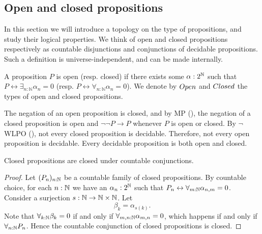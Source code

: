 %
\subsection{Open and closed propositions}
In this section we will introduce a topology on the type of propositions, and 
study their logical properties.
We think of open and closed propositions respectively as countable disjunctions and conjunctions of decidable propositions.
Such a definition is universe-independent, and can be made internally.

\begin{definition}
A proposition $P$ is open (resp. closed) if there exists some $\alpha:2^{\mathbb{N}}$ such that $P \leftrightarrow \exists_{n:\mathbb N} \alpha_n = 0$ (resp. $P \leftrightarrow \forall_{n:\mathbb N} \alpha_n = 0$). We denote by $\Open$ and $\Closed$ the types of open and closed propositions.
\end{definition}

\begin{remark}\label{rmkOpenClosedNegation}
  The negation of an open proposition is closed, 
  and by MP (), the negation of a closed proposition is open %
  and $\neg \neg P \to P$ whenever $P$ is open or closed. 
  By $\neg$WLPO (), 
  not every closed proposition is decidable. 
  Therefore, not every open proposition is decidable. 
  Every decidable proposition is both open and closed.
\end{remark}

\begin{lemma}\label{ClosedCountableConjunction}
  Closed propositions are closed under countable conjunctions.
\end{lemma}
\begin{proof}
  Let $(P_n)_{n:\mathbb{N}}$ be a countable family of closed propositions. 
  By countable choice, for each 
  $n:\mathbb{N}$ we have an $\alpha_n:2^{\mathbb{N}} $ 
  such that $P_n \leftrightarrow \forall_{m:\mathbb{N}} \alpha_{n,m} =0$. 
  Consider a surjection $s:\mathbb{N} \to \mathbb{N} \times \mathbb{N}$.
  Let 
  $$\beta_k = \alpha_{s(k)}.$$
  Note that $\forall_{k:\mathbb{N}} \beta_k = 0$ if and only if 
  $\forall_{m,n:\mathbb{N}}\alpha_{m,n} = 0$, which happens if and only if $\forall_{n:\mathbb{N}} P_n$. 
  Hence the countable conjunction of closed propositions is closed. 
\end{proof} 

